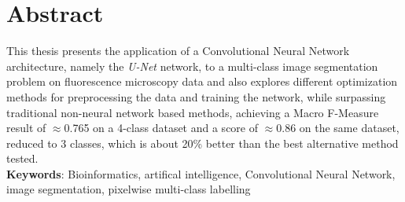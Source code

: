 \chapter*{Abstract}

\noindent This thesis presents the application of a Convolutional Neural Network architecture, namely the \textit{U-Net} network, to a multi-class image segmentation problem on fluorescence microscopy data and also explores different optimization methods for preprocessing the data and training the network, while surpassing traditional non-neural network based methods, achieving a Macro F-Measure result of $\approx$0.765 on a 4-class dataset and a score of $\approx$0.86 on the same dataset, reduced to 3 classes, which is about 20\% better than the best alternative method tested.\\

\noindent \textbf{Keywords}: Bioinformatics, artifical intelligence, Convolutional Neural Network, image segmentation, pixelwise multi-class labelling